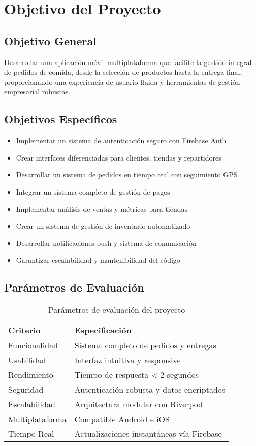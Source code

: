 \documentclass[12pt,a4paper]{article}
\begin{document}
\section{Objetivo del Proyecto}

\subsection{Objetivo General}
Desarrollar una aplicación móvil multiplataforma que facilite la gestión integral de pedidos de comida, desde la selección de productos hasta la entrega final, proporcionando una experiencia de usuario fluida y herramientas de gestión empresarial robustas.

\subsection{Objetivos Específicos}
\begin{itemize}[itemsep=0.5em]
    \item Implementar un sistema de autenticación seguro con Firebase Auth
    \item Crear interfaces diferenciadas para clientes, tiendas y repartidores
    \item Desarrollar un sistema de pedidos en tiempo real con seguimiento GPS
    \item Integrar un sistema completo de gestión de pagos
    \item Implementar análisis de ventas y métricas para tiendas
    \item Crear un sistema de gestión de inventario automatizado
    \item Desarrollar notificaciones push y sistema de comunicación
    \item Garantizar escalabilidad y mantenibilidad del código
\end{itemize}

\subsection{Parámetros de Evaluación}
\begin{table}[H]
\centering
\begin{tabular}{@{}ll@{}}
\toprule
\textbf{Criterio} & \textbf{Especificación} \\
\midrule
Funcionalidad & Sistema completo de pedidos y entregas \\
Usabilidad & Interfaz intuitiva y responsive \\
Rendimiento & Tiempo de respuesta < 2 segundos \\
Seguridad & Autenticación robusta y datos encriptados \\
Escalabilidad & Arquitectura modular con Riverpod \\
Multiplataforma & Compatible Android e iOS \\
Tiempo Real & Actualizaciones instantáneas vía Firebase \\
\bottomrule
\end{tabular}
\caption{Parámetros de evaluación del proyecto}
\end{table}
\end{document}
